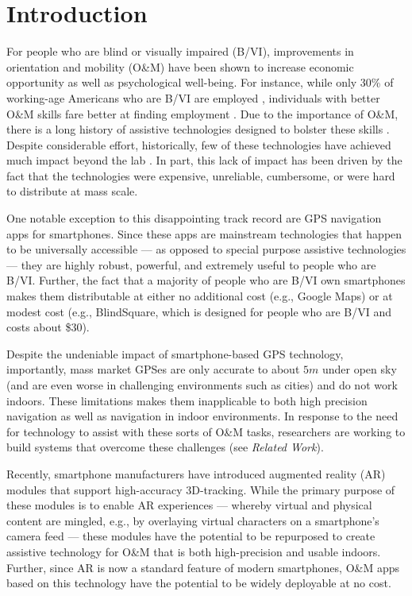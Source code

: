 \documentclass[chi_draft]{sigchi}
\newcommand{\BVI}{B/VI\xspace}
\newcommand{\OM}{O\&M\xspace}
\begin{document}
\section{Introduction}
For people who are blind or visually impaired (\BVI), improvements in orientation and mobility (\OM) have been shown to increase economic opportunity as well as psychological well-being.  For instance, while only 30\% of working-age Americans who are \BVI are employed \cite{employmentstatistics2017, kirchner1999looking}, individuals with better \OM skills fare better at finding employment \cite{crudden1998comprehensive, crudden1999barriers, leonard1999factors, o1999employment}.  Due to the importance of \OM, there is a long history of assistive technologies designed to bolster these skills  \cite{benjamin1973new, borenstein1997guidecane}.  Despite considerable effort, historically, few of these technologies have achieved much impact beyond the lab \cite{wiener2010foundations}.  In part, this lack of impact has been driven by the fact that the technologies were expensive, unreliable, cumbersome, or were hard to distribute at mass scale.

One notable exception to this disappointing track record are GPS navigation apps for smartphones.  Since these apps are mainstream technologies that happen to be universally accessible --- as opposed to special purpose assistive technologies --- they are highly robust, powerful, and extremely useful to people who are \BVI.  Further, the fact that a majority of people who are \BVI own smartphones \cite{morris2014blind} makes them distributable at either no additional cost (e.g., Google Maps) or at modest cost (e.g., BlindSquare, which is designed for people who are \BVI and costs about \$30).

Despite the undeniable impact of smartphone-based GPS technology, importantly, mass market GPSes are only accurate to about $5m$ under open sky (and are even worse in challenging environments such as cities) and do not work indoors.  These limitations makes them inapplicable to both high precision navigation as well as navigation in indoor environments.  In response to the need for technology to assist with these sorts of \OM tasks, researchers are working to build systems that overcome these challenges (see \emph{Related Work}).

Recently, smartphone manufacturers have introduced augmented reality (AR) modules that support high-accuracy 3D-tracking.  While the primary purpose of these modules is to enable AR experiences --- whereby virtual and physical content are mingled, e.g., by overlaying virtual characters on a smartphone's camera feed --- these modules have the potential to be repurposed to create assistive technology for \OM that is both high-precision and usable indoors.  Further, since AR is now a standard feature of modern smartphones, \OM apps based on this technology have the potential to be widely deployable at no cost.
\end{document}
